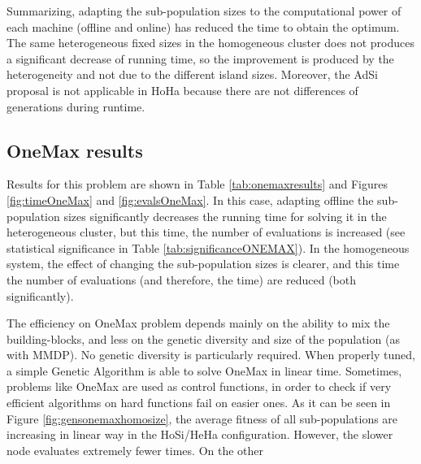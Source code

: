 \begin{table}
\end{table}



Summarizing, adapting the sub-population sizes to the computational power of each machine (offline and online) has reduced the time to obtain the optimum. The same heterogeneous fixed sizes in the homogeneous cluster does not produces a significant decrease of running time, so the improvement is produced by the heterogeneity and not due to the different island sizes. Moreover, the AdSi proposal is not applicable in HoHa because there are not differences of generations during runtime.

\subsection{OneMax results}

Results for this problem are shown in Table \ref{tab:onemaxresults} and Figures  \ref{fig:timeOneMax} and \ref{fig:evalsOneMax}. In this case, adapting offline the sub-population sizes significantly decreases  the running time for solving it in the heterogeneous cluster, but this time, the number of evaluations is increased (see statistical significance in Table \ref{tab:significanceONEMAX}). In the homogeneous system, the effect of changing the sub-population sizes is clearer, and this time the number of evaluations (and therefore, the time) are reduced (both significantly). 

The efficiency on OneMax problem depends mainly on the ability to mix
the building-blocks, and less on the genetic diversity and size of the
population (as with MMDP). No genetic diversity is particularly
required. When properly tuned, a simple Genetic Algorithm is able to
solve OneMax in linear time. Sometimes, problems like OneMax are used
as control functions, in order to check if very efficient algorithms
on hard functions fail on easier ones. As it can be seen in Figure
\ref{fig:gensonemaxhomosize}, the average fitness of all sub-populations
are increasing in linear way in the HoSi/HeHa configuration. However,
the slower node evaluates extremely fewer times.  On the other

